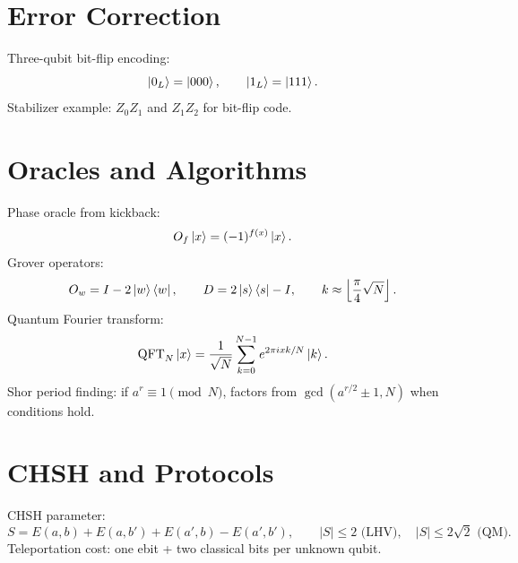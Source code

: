 \section{Error Correction}

Three-qubit bit-flip encoding:
\begin{equation}
\ket{0_L}=\ket{000},\qquad \ket{1_L}=\ket{111}.
\end{equation}
Stabilizer example: $Z_0Z_1$ and $Z_1Z_2$ for bit-flip code.

\section{Oracles and Algorithms}

Phase oracle from kickback:
\begin{equation}
O_f\ket{x}=(-1)^{f(x)}\ket{x}.
\end{equation}
Grover operators:
\begin{equation}
O_w=I-2\ket{w}\bra{w},\qquad D=2\ket{s}\bra{s}-I,\qquad k\approx\left\lfloor\frac{\pi}{4}\sqrt{N}\right\rfloor.
\end{equation}
Quantum Fourier transform:
\begin{equation}
\mathrm{QFT}_N\ket{x}=\frac{1}{\sqrt{N}}\sum_{k=0}^{N-1}e^{2\pi i xk/N}\ket{k}.
\end{equation}
Shor period finding: if $a^r\equiv 1\pmod N$, factors from $\gcd(a^{r/2}\pm 1,N)$ when conditions hold.

\section{CHSH and Protocols}

CHSH parameter:
\begin{equation}
S=E(a,b)+E(a,b')+E(a',b)-E(a',b'),\qquad |S|\le 2 \text{ (LHV)},\quad |S|\le 2\sqrt2 \text{ (QM)}.
\end{equation}
Teleportation cost: one ebit + two classical bits per unknown qubit.
